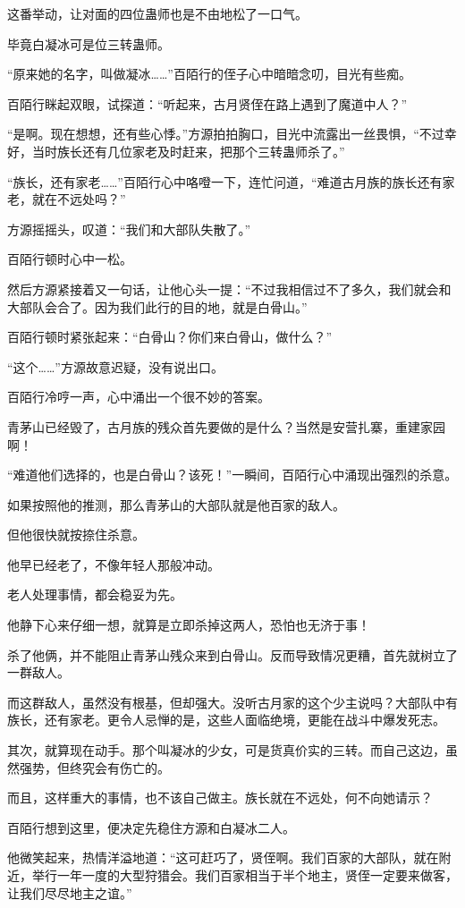 \begin{this_body}
这番举动，让对面的四位蛊师也是不由地松了一口气。

毕竟白凝冰可是位三转蛊师。

“原来她的名字，叫做凝冰……”百陌行的侄子心中暗暗念叨，目光有些痴。

百陌行眯起双眼，试探道：“听起来，古月贤侄在路上遇到了魔道中人？”

“是啊。现在想想，还有些心悸。”方源拍拍胸口，目光中流露出一丝畏惧，“不过幸好，当时族长还有几位家老及时赶来，把那个三转蛊师杀了。”

“族长，还有家老……”百陌行心中咯噔一下，连忙问道，“难道古月族的族长还有家老，就在不远处吗？”

方源摇摇头，叹道：“我们和大部队失散了。”

百陌行顿时心中一松。

然后方源紧接着又一句话，让他心头一提：“不过我相信过不了多久，我们就会和大部队会合了。因为我们此行的目的地，就是白骨山。”

百陌行顿时紧张起来：“白骨山？你们来白骨山，做什么？”

“这个……”方源故意迟疑，没有说出口。

百陌行冷哼一声，心中涌出一个很不妙的答案。

青茅山已经毁了，古月族的残众首先要做的是什么？当然是安营扎寨，重建家园啊！

“难道他们选择的，也是白骨山？该死！”一瞬间，百陌行心中涌现出强烈的杀意。

如果按照他的推测，那么青茅山的大部队就是他百家的敌人。

但他很快就按捺住杀意。

他早已经老了，不像年轻人那般冲动。

老人处理事情，都会稳妥为先。

他静下心来仔细一想，就算是立即杀掉这两人，恐怕也无济于事！

杀了他俩，并不能阻止青茅山残众来到白骨山。反而导致情况更糟，首先就树立了一群敌人。

而这群敌人，虽然没有根基，但却强大。没听古月家的这个少主说吗？大部队中有族长，还有家老。更令人忌惮的是，这些人面临绝境，更能在战斗中爆发死志。

其次，就算现在动手。那个叫凝冰的少女，可是货真价实的三转。而自己这边，虽然强势，但终究会有伤亡的。

而且，这样重大的事情，也不该自己做主。族长就在不远处，何不向她请示？

百陌行想到这里，便决定先稳住方源和白凝冰二人。

他微笑起来，热情洋溢地道：“这可赶巧了，贤侄啊。我们百家的大部队，就在附近，举行一年一度的大型狩猎会。我们百家相当于半个地主，贤侄一定要来做客，让我们尽尽地主之谊。”


\end{this_body}
